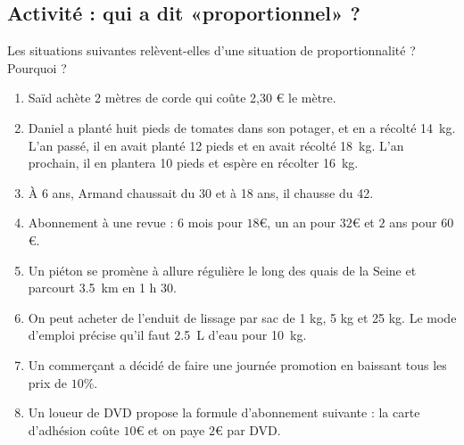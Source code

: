 
\subsection*{Activité : qui a dit «proportionnel» ?}

Les situations suivantes relèvent-elles d’une situation de proportionnalité ? Pourquoi ?
\begin{enumerate}
    \item

 Saïd achète 2 mètres de corde qui coûte 2,30 € le mètre.

\item
    Daniel a planté huit pieds de tomates dans son potager, et en a récolté \SI{14}{\kilo\gram}. L'an passé, il en avait planté 12 pieds et en avait récolté \SI{18}{\kilo\gram}. L'an prochain, il en plantera 10 pieds et espère en récolter \SI{16}{\kilo\gram}. 

\item
 À 6 ans, Armand chaussait du 30 et à 18 ans, il chausse du 42.
\item

 Abonnement à une revue : \( 6\) mois pour \( 18\)€, un an pour \( 32\)€ et \( 2\) ans pour \( 60\)€.
\item
    Un piéton se promène à allure régulière le long des quais de la Seine et parcourt \SI{3.5}{\kilo\meter} en 1 h 30.
\item

    On peut acheter de l'enduit de lissage par sac de 1 kg, 5 kg et 25 kg. Le mode d’emploi précise qu'il faut \SI{2.5}{\liter} d’eau pour \SI{10}{\kilo\gram}.
\item

 Un commerçant a décidé de faire une journée promotion en baissant tous les prix de $10$\%.
\item

 Un loueur de DVD propose la formule d'abonnement suivante : la carte d'adhésion coûte $10$€ et on paye $2$€ par DVD.

\end{enumerate}
